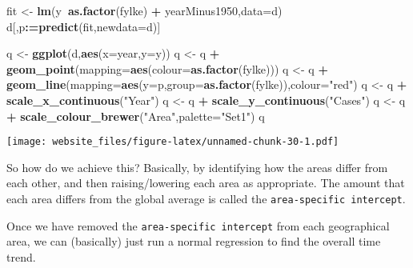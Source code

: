 \documentclass[]{book}
\newenvironment{Shaded}{\begin{snugshade}}{\end{snugshade}}
\newcommand{\KeywordTok}[1]{\textcolor[rgb]{0.13,0.29,0.53}{\textbf{#1}}}
\newcommand{\DataTypeTok}[1]{\textcolor[rgb]{0.13,0.29,0.53}{#1}}
\newcommand{\StringTok}[1]{\textcolor[rgb]{0.31,0.60,0.02}{#1}}
\newcommand{\OperatorTok}[1]{\textcolor[rgb]{0.81,0.36,0.00}{\textbf{#1}}}
\newcommand{\ErrorTok}[1]{\textcolor[rgb]{0.64,0.00,0.00}{\textbf{#1}}}
\newcommand{\NormalTok}[1]{#1}
\begin{document}
\begin{Shaded}
\begin{Highlighting}[]
\NormalTok{fit <-}\StringTok{ }\KeywordTok{lm}\NormalTok{(y}\OperatorTok{~}\KeywordTok{as.factor}\NormalTok{(fylke) }\OperatorTok{+}\StringTok{ }\NormalTok{yearMinus1950,}\DataTypeTok{data=}\NormalTok{d)}
\NormalTok{d[,p}\OperatorTok{:}\ErrorTok{=}\KeywordTok{predict}\NormalTok{(fit,}\DataTypeTok{newdata=}\NormalTok{d)]}

\NormalTok{q <-}\StringTok{ }\KeywordTok{ggplot}\NormalTok{(d,}\KeywordTok{aes}\NormalTok{(}\DataTypeTok{x=}\NormalTok{year,}\DataTypeTok{y=}\NormalTok{y))}
\NormalTok{q <-}\StringTok{ }\NormalTok{q }\OperatorTok{+}\StringTok{ }\KeywordTok{geom_point}\NormalTok{(}\DataTypeTok{mapping=}\KeywordTok{aes}\NormalTok{(}\DataTypeTok{colour=}\KeywordTok{as.factor}\NormalTok{(fylke)))}
\NormalTok{q <-}\StringTok{ }\NormalTok{q }\OperatorTok{+}\StringTok{ }\KeywordTok{geom_line}\NormalTok{(}\DataTypeTok{mapping=}\KeywordTok{aes}\NormalTok{(}\DataTypeTok{y=}\NormalTok{p,}\DataTypeTok{group=}\KeywordTok{as.factor}\NormalTok{(fylke)),}\DataTypeTok{colour=}\StringTok{"red"}\NormalTok{)}
\NormalTok{q <-}\StringTok{ }\NormalTok{q }\OperatorTok{+}\StringTok{ }\KeywordTok{scale_x_continuous}\NormalTok{(}\StringTok{"Year"}\NormalTok{)}
\NormalTok{q <-}\StringTok{ }\NormalTok{q }\OperatorTok{+}\StringTok{ }\KeywordTok{scale_y_continuous}\NormalTok{(}\StringTok{"Cases"}\NormalTok{)}
\NormalTok{q <-}\StringTok{ }\NormalTok{q }\OperatorTok{+}\StringTok{ }\KeywordTok{scale_colour_brewer}\NormalTok{(}\StringTok{"Area"}\NormalTok{,}\DataTypeTok{palette=}\StringTok{"Set1"}\NormalTok{)}
\NormalTok{q}
\end{Highlighting}
\end{Shaded}

\texttt{[image: website\_files/figure-latex/unnamed-chunk-30-1.pdf]}

So how do we achieve this? Basically, by identifying how the areas
differ from each other, and then raising/lowering each area as
appropriate. The amount that each area differs from the global average
is called the \texttt{area-specific\ intercept}.

Once we have removed the \texttt{area-specific\ intercept} from each
geographical area, we can (basically) just run a normal regression to
find the overall time trend.
\end{document}
